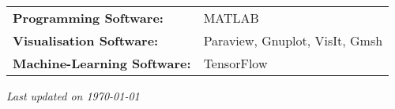 \documentclass[margin]{res}
\begin{document}
\begin{resume}
\begin{tabular}{@{}ll}
    {\bf Programming Software:} &  MATLAB \\
    
    {\bf Visualisation Software:} & Paraview, Gnuplot, VisIt, Gmsh \\
    
    {\bf Machine-Learning Software:} & TensorFlow
 \end{tabular}


\end{resume} 


\vfill
\begin{flushright}
\textit{Last updated on \today}
\end{flushright}
\end{document}
